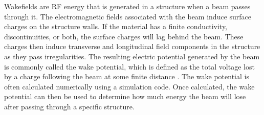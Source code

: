 
Wakefields are RF energy that is generated in a structure when a beam passes through it. 
The electromagnetic fields
associated with the beam induce surface charges on the structure walls.
If the material has a finite conductivity, discontinuities, or both, the
surface charges will lag behind the beam. These charges then induce
transverse and longitudinal field components in the structure as they
pass irregularities. The resulting electric potential
generated by the beam is commonly called the wake potential, which
is defined as the total voltage lost by a charge following the beam
at some finite distance \cite{SLACwakefields}. The wake potential is 
often calculated numerically using a simulation code. Once calculated, 
the wake potential can then be used to determine how much energy the 
beam will lose after passing through a specific structure. 

